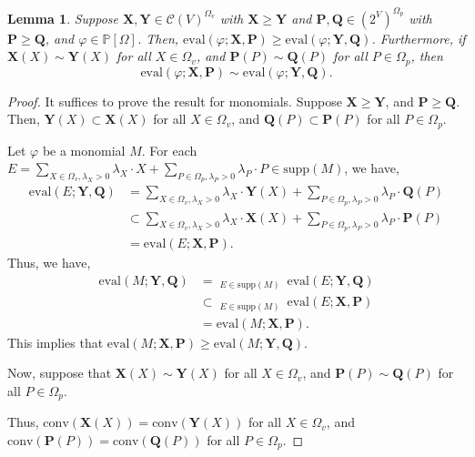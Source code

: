 \documentclass[10pt]{amsart}
\theoremstyle{plain}
\newtheorem{lemma}{Lemma}[section]
\theoremstyle{definition}
\providecommand{\cC}[0]{\ensuremath{\mathcal C}\xspace}
\providecommand{\bP}[0]{\ensuremath{\mathbf P}\xspace}
\providecommand{\bQ}[0]{\ensuremath{\mathbf Q}\xspace}
\providecommand{\bX}[0]{\ensuremath{\mathbf X}\xspace}
\providecommand{\bY}[0]{\ensuremath{\mathbf Y}\xspace}
\let\geq\geqslant
\providecommand{\Cmult}[0]{\ensuremath{\mathop{\mathring{\bigstar}}}\xspace}
\providecommand{\conv}[1]{\ensuremath{\mathrm{conv}{\left({#1}\right)}\xspace}}
\providecommand{\convset}[0]{\ensuremath{\cC}\xspace}
\providecommand{\evalmap}[0]{\ensuremath{\mathrm{eval}}\xspace}
\providecommand{\elem}[0]{\ensuremath{\mathrm{supp}}\xspace}
\begin{document}
\begin{lemma}
\label{lem:monotonicity}
    Suppose $\bX,\bY \in \convset(V)^{\Omega_v}$ with $\bX\geq \bY$ and
    $\bP,\bQ \in (2^V)^{\Omega_p}$ with $\bP\geq \bQ$, and  $\varphi \in \mathbb{P}[\Omega]$.
    Then,
        $ \evalmap\left(\varphi ; \bX,\bP\right) \geq \evalmap\left(\varphi ; \bY,\bQ\right) $.
    Furthermore, 
    if $\bX(X) \sim \bY(X)$ for all $X \in \Omega_v$, and
    $\bP(P) \sim \bQ(P)$ for all $P \in \Omega_p$, then
    \[
    \evalmap\left(\varphi ; \bX,\bP\right) \sim \evalmap\left(\varphi ; \bY,\bQ\right).
    \]
\end{lemma}
\begin{proof}
    It suffices to prove the result for monomials. 
    Suppose $\bX\geq \bY$, and $\bP\geq \bQ$. Then, $\bY(X)\subset \bX(X)$ for all $X \in \Omega_v$,
    and  $\bQ(P) \subset \bP(P) $ for all $P \in \Omega_p$. 
    
    Let $\varphi$ be a monomial $M$. For each 
    $E = 
\sum_{X \in \Omega_v, \lambda_X >0} \lambda_X \cdot X + \sum_{P \in \Omega_p, \lambda_P > 0} \lambda_P \cdot P    
    \in \elem(M)$, we have, 
\begin{align*}
\evalmap\left(E;\bY,\bQ\right)&=
\sum_{X \in \Omega_v, \lambda_X >0} \lambda_X \cdot \bY(X) + \sum_{P \in \Omega_p, \lambda_P > 0} \lambda_P \cdot \bQ(P) \\
&\subset 
\sum_{X \in \Omega_v, \lambda_X > 0} \lambda_X \cdot \bX(X) + \sum_{P \in \Omega_p, \lambda_P > 0} \lambda_P \cdot \bP(P)\\
&=\evalmap\left(E;\bX,\bP\right).
\end{align*}
Thus, we have,
\begin{align*}
    \evalmap\left(M; \bY,\bQ\right)&=\Cmult_{E\in\elem(M)} ~ \evalmap(E;\bY,\bQ)\\
    &\subset \Cmult_{E\in\elem(M)} ~ \evalmap(E;\bX,\bP)\\
    &=\evalmap\left(M; \bX,\bP\right).
\end{align*}
This implies that $\evalmap\left(M;\bX,\bP\right)\geq \evalmap\left(M;\bY,\bQ\right)$.



Now, suppose that $\bX(X)\sim \bY(X)$ for all $X \in \Omega_v$, and $\bP(P)\sim\bQ(P)$ for all $P \in \Omega_p$.

Thus, $\conv{\bX(X)}=\conv{\bY(X)}$ for all $X \in \Omega_v$, and $\conv{\bP(P)}=\conv{\bQ(P)}$ for all $P \in \Omega_p$.


\end{proof}
\end{document}
